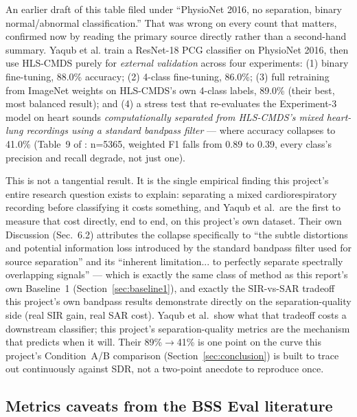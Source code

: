 \documentclass[11pt]{article}
\begin{document}
An earlier draft of this table filed \cite{spectrotemporal} under
``PhysioNet 2016, no separation, binary normal/abnormal classification.''
That was wrong on every count that matters, confirmed now by reading the
primary source directly rather than a second-hand summary. Yaqub et al.
train a ResNet-18 PCG classifier on PhysioNet 2016, then use HLS-CMDS
purely for \emph{external validation} across four experiments: (1) binary
fine-tuning, 88.0\% accuracy; (2) 4-class fine-tuning, 86.0\%; (3) full
retraining from ImageNet weights on HLS-CMDS's own 4-class labels, 89.0\%
(their best, most balanced result); and (4) a stress test that re-evaluates
the Experiment-3 model on heart sounds \emph{computationally separated from
HLS-CMDS's mixed heart-lung recordings using a standard bandpass filter} ---
where accuracy collapses to 41.0\% (Table~9 of \cite{spectrotemporal}: n=5365,
weighted F1 falls from 0.89 to 0.39, every class's precision and recall
degrade, not just one).

This is not a tangential result. It is the single empirical finding this
project's entire research question exists to explain: separating a mixed
cardiorespiratory recording before classifying it costs something, and
Yaqub et al.\ are the first to measure that cost directly, end to end, on
this project's own dataset. Their own Discussion (Sec.~6.2) attributes the
collapse specifically to ``the subtle distortions and potential information
loss introduced by the standard bandpass filter used for source
separation'' and its ``inherent limitation... to perfectly separate
spectrally overlapping signals'' --- which is exactly the same class of
method as this report's own Baseline~1 (Section~\ref{sec:baseline1}), and
exactly the SIR-vs-SAR tradeoff this project's own bandpass results
demonstrate directly on the separation-quality side (real SIR gain, real
SAR cost). Yaqub et al.\ show what that tradeoff costs a downstream
classifier; this project's separation-quality metrics are the mechanism
that predicts when it will. Their 89\%$\to$41\% is one point on the curve
this project's Condition~A/B comparison (Section~\ref{sec:conclusion}) is
built to trace out continuously against SDR, not a two-point anecdote to
reproduce once.

\subsection{Metrics caveats from the BSS Eval literature}
\label{sec:relatedmetrics}
\end{document}
